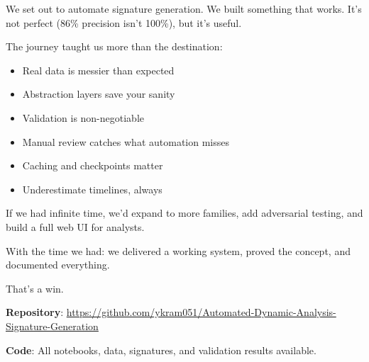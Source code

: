 \documentclass[11pt]{article}
\begin{document}
We set out to automate signature generation. We built something that works. It's not perfect (86\% precision isn't 100\%), but it's useful.

The journey taught us more than the destination:
\begin{itemize}
    \item Real data is messier than expected
    \item Abstraction layers save your sanity
    \item Validation is non-negotiable
    \item Manual review catches what automation misses
    \item Caching and checkpoints matter
    \item Underestimate timelines, always
\end{itemize}

If we had infinite time, we'd expand to more families, add adversarial testing, and build a full web UI for analysts.

With the time we had: we delivered a working system, proved the concept, and documented everything.

That's a win.

\vspace{1cm}

\textbf{Repository}: \url{https://github.com/ykram051/Automated-Dynamic-Analysis-Signature-Generation}

\textbf{Code}: All notebooks, data, signatures, and validation results available.
\end{document}
